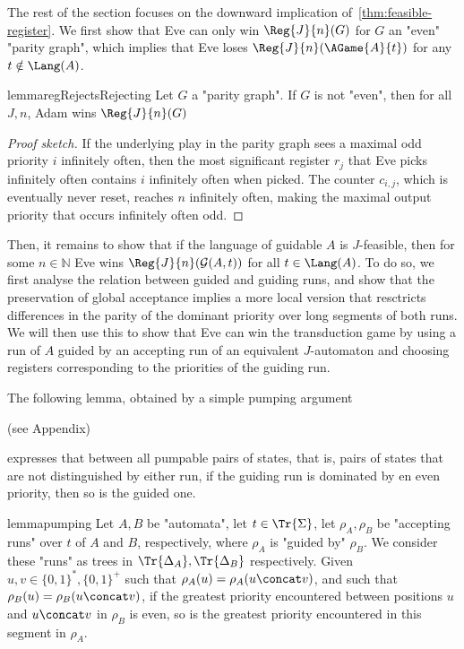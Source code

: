 \documentclass[a4paper,UKenglish,cleveref, autoref, thm-restate]{lipics-v2021}
\newif\ificalp
\newcommand{\NN}{\mathbb{N}}
\newcommand{\G}{\mathcal{G}}
\begin{document}
The rest of the section focuses on the downward implication of~\cref{thm:feasible-register}. We first show that Eve can only win $\Reg{J}{n}(G)$ for $G$ an "even" "parity graph", which implies that Eve loses $\Reg{J}{n}(\AGame{A}{t})$ for any $t\notin \Lang(A)$.



\begin{restatable}{lemma}{regRejectsRejecting}\label{lem:reg-rejects-rejecting}
	Let $G$ a "parity graph". If $G$ is not "even", then for all $J,n$, Adam wins $\Reg{J}{n}(G)$
\end{restatable}

\begin{proof}[Proof sketch]
If the underlying play in the parity graph sees a maximal odd priority $i$ infinitely often, then the most significant register $r_j$ that Eve picks infinitely often contains $i$ infinitely often when  picked. The counter $c_{i,j}$, which is eventually never reset, reaches $n$ infinitely often, making the maximal output priority that occurs infinitely often odd.
\end{proof}



Then, it remains to show that if the language of guidable $A$ is $J$-feasible, then for some $n\in \NN$ Eve wins $\Reg{J}{n}(\G(A,t))$ for all $t\in \Lang(A)$.
To do so, we first analyse the relation between guided and guiding runs, and show that the preservation of global acceptance implies a more local version that resctricts differences in the parity of the dominant priority over long segments of both runs. We will then use this to show that Eve can win the transduction game by using a run of $A$ guided by an accepting run of an equivalent $J$-automaton and choosing registers corresponding to the priorities of the guiding run.

The following lemma, obtained by a simple pumping argument 
\ificalp
(see full version)
\else
(see Appendix)
\fi
 expresses that between all pumpable pairs of states, that is, pairs of states that are not distinguished by either run, if the guiding run is dominated by en even priority, then so is the guided one. 

\begin{restatable}{lemma}{pumping}\label{cl:pump}
	Let $A,B$ be "automata", let $t\in \Tr{\Sigma}$, let $\rho_A, \rho_B$ be "accepting runs" over $t$ of $A$ and $B$, respectively, where $\rho_A$ is "guided by" $\rho_B$. We consider these "runs" as trees in $\Tr{\Delta_A},\Tr{\Delta_B}$ respectively. 
	Given $u,v \in \{0,1\}^*, \{0,1\}^+$ such that $\rho_A(u) = \rho_A(u\concat v)$, and such that $\rho_B(u) = \rho_B(u\concat v)$, if the greatest priority encountered between positions $u$ and $u \concat v$ in $\rho_B$ is even, so is the greatest priority encountered in this segment in $\rho_A$.
\end{restatable}
\end{document}
